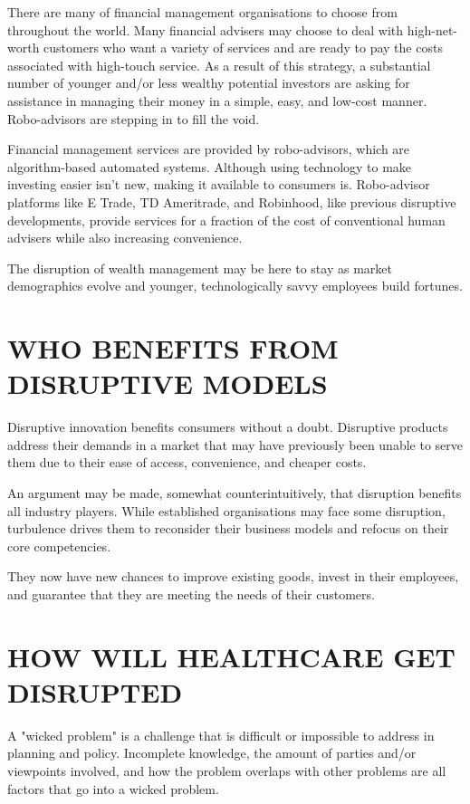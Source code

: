 \documentclass{article}
\begin{document}
There are many of financial management organisations to choose from throughout the world. Many financial advisers may choose to deal with high-net-worth customers who want a variety of services and are ready to pay the costs associated with high-touch service. As a result of this strategy, a substantial number of younger and/or less wealthy potential investors are asking for assistance in managing their money in a simple, easy, and low-cost manner. Robo-advisors are stepping in to fill the void.


Financial management services are provided by robo-advisors, which are algorithm-based automated systems. Although using technology to make investing easier isn't new, making it available to consumers is. Robo-advisor platforms like E Trade, TD Ameritrade, and Robinhood, like previous disruptive developments, provide services for a fraction of the cost of conventional human advisers while also increasing convenience.


The disruption of wealth management may be here to stay as market demographics evolve and younger, technologically savvy employees build fortunes.

\section{WHO BENEFITS FROM DISRUPTIVE MODELS}

Disruptive innovation benefits consumers without a doubt. Disruptive products address their demands in a market that may have previously been unable to serve them due to their ease of access, convenience, and cheaper costs.


An argument may be made, somewhat counterintuitively, that disruption benefits all industry players. While established organisations may face some disruption, turbulence drives them to reconsider their business models and refocus on their core competencies.


They now have new chances to improve existing goods, invest in their employees, and guarantee that they are meeting the needs of their customers.

\section{HOW WILL HEALTHCARE GET DISRUPTED}

A "wicked problem" is a challenge that is difficult or impossible to address in planning and policy. Incomplete knowledge, the amount of parties and/or viewpoints involved, and how the problem overlaps with other problems are all factors that go into a wicked problem.
\end{document}
